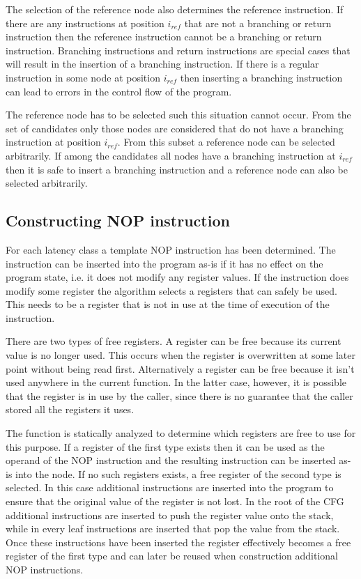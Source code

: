 The selection of the reference node also determines the reference instruction. 
If there are any instructions at position $i_{ref}$ that are not a branching or return instruction then the reference instruction cannot be a branching or return instruction. 
Branching instructions and return instructions are special cases that will result in the insertion of a branching instruction. 
If there is a regular instruction in some node at position $i_{ref}$ then inserting a branching instruction can lead to errors in the control flow of the program. 

The reference node has to be selected such this situation cannot occur. From the set of candidates only those nodes are considered that do not have a branching instruction at position $i_{ref}$. 
From this subset a reference node can be selected arbitrarily. If among the candidates all nodes have a branching instruction at $i_{ref}$ then it is safe to insert a branching instruction 
and a reference node can also be selected arbitrarily. 
 
\subsection{Constructing NOP instruction}
For each latency class a template NOP instruction has been determined. 
The instruction can be inserted into the program as-is if it has no effect on the program state, i.e. it does not modify any register values. 
If the instruction does modify some register the algorithm selects a registers that can safely be used. 
This needs to be a register that is not in use at the time of execution of the instruction. 

There are two types of free registers. 
A register can be free because its current value is no longer used. This occurs when the register is overwritten at some later point without being read first. 
Alternatively a register can be free because it isn't used anywhere in the current function. 
In the latter case, however, it is possible that the register is in use by the caller, since there is no guarantee that the caller stored all the registers it uses. 

The function is statically analyzed to determine which registers are free to use for this purpose. 
If a register of the first type exists then it can be used as the operand of the NOP instruction and the resulting instruction 
can be inserted as-is into the node. If no such registers exists, a free register of the second type is selected. 
In this case additional instructions are inserted into the program to ensure that the original value of the register is not lost. 
In the root of the CFG additional instructions are inserted to push the register value onto the stack, while in every leaf instructions are inserted 
that pop the value from the stack. Once these instructions have been inserted the register effectively becomes a free register of the first type and can 
later be reused when construction additional NOP instructions.

